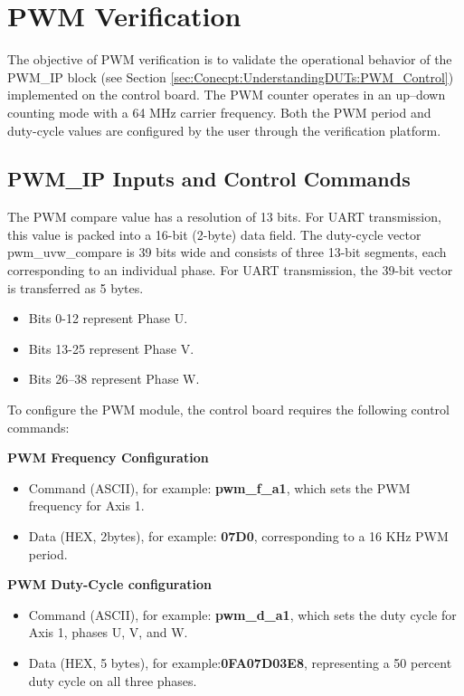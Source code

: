 \section{\acs{PWM} Verification}
\label{sec:Implementation:PWM_Verification}

The objective of \acs{PWM} verification is to validate the operational behavior of the \acs{PWM}\_IP block (see Section \ref{sec:Conecpt:UnderstandingDUTs:PWM_Control}) implemented on the control board. The \acs{PWM} counter operates in an up–down counting mode with a 64 MHz carrier frequency. Both the \acs{PWM} period and duty-cycle values are configured by the user through the verification platform.

\subsection{\acs{PWM}\_IP Inputs and Control Commands}
\label{sec:Implementation:PWM_IP_Inputs_and_ControlCommands}

The \acs{PWM} compare value has a resolution of 13 bits. For \acs{UART} transmission, this value is packed into a 16-bit (2-byte) data field. The duty-cycle vector pwm\_uvw\_compare is 39 bits wide and consists of three 13-bit segments, each corresponding to an individual phase. For \acs{UART} transmission, the 39-bit vector is transferred as 5 bytes.

\begin{itemize}
	\item Bits 0-12 represent Phase U.
	\item Bits 13-25 represent Phase V.
	\item Bits 26–38 represent Phase W.
\end{itemize}

To configure the \acs{PWM} module, the control board requires the following control commands:

\textbf{\acs{PWM} Frequency Configuration}

\begin{itemize}
	\item Command (ASCII), for example: \textbf{pwm\_f\_a1}, which sets the \acs{PWM} frequency for Axis 1.
	\item Data (HEX, 2bytes), for example: \textbf{07D0}, corresponding to a 16 KHz \acs{PWM} period.
\end{itemize}

\textbf{\acs{PWM} Duty-Cycle configuration}
\begin{itemize}
	\item Command (ASCII), for example: \textbf{pwm\_d\_a1}, which sets the duty cycle for Axis 1, phases U, V, and W.
	\item Data (HEX, 5 bytes), for example:\textbf{0FA07D03E8}, representing a 50 percent duty cycle on all three phases.
\end{itemize}

